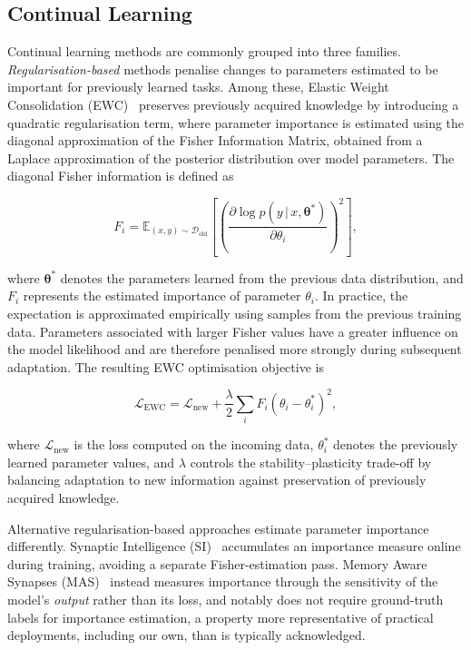 \documentclass[journal]{IEEEtran}
\begin{document}
\subsection{Continual Learning}
\label{sec:related_cl}

Continual learning methods are commonly grouped into three families.
\emph{Regularisation-based} methods penalise changes to parameters
estimated to be important for previously learned tasks. Among these,
Elastic Weight Consolidation (EWC)~\cite{kirkpatrick2017overcoming}
preserves previously acquired knowledge by introducing a quadratic
regularisation term, where parameter importance is estimated using the
diagonal approximation of the Fisher Information Matrix, obtained from a
Laplace approximation of the posterior distribution over model
parameters. The diagonal Fisher information is defined as

\begin{equation}
F_i =
\mathbb{E}_{(x,y)\sim\mathcal{D}_{\mathrm{old}}}
\left[
\left(
\frac{\partial
\log p(y\,|\,x,\boldsymbol{\theta}^{*})}
{\partial \theta_i}
\right)^2
\right],
\label{eq:fisher}
\end{equation}

where $\boldsymbol{\theta}^{*}$ denotes the parameters learned from the
previous data distribution, and $F_i$ represents the estimated
importance of parameter $\theta_i$. In practice, the expectation is
approximated empirically using samples from the previous training data.
Parameters associated with larger Fisher values have a greater influence
on the model likelihood and are therefore penalised more strongly during
subsequent adaptation. The resulting EWC optimisation objective is

\begin{equation}
\mathcal{L}_{\mathrm{EWC}}
=
\mathcal{L}_{\mathrm{new}}
+
\frac{\lambda}{2}
\sum_i
F_i
\left(
\theta_i-\theta_i^{*}
\right)^2,
\label{eq:ewc}
\end{equation}

where $\mathcal{L}_{\mathrm{new}}$ is the loss computed on the incoming
data, $\theta_i^{*}$ denotes the previously learned parameter values,
and $\lambda$ controls the stability--plasticity trade-off by balancing
adaptation to new information against preservation of previously
acquired knowledge.

Alternative regularisation-based approaches estimate parameter
importance differently. Synaptic Intelligence (SI)~\cite{zenke2017continual}
accumulates an importance measure online during training, avoiding a
separate Fisher-estimation pass. Memory Aware Synapses
(MAS)~\cite{aljundi2018memory} instead measures importance through the
sensitivity of the model's \emph{output} rather than its loss, and
notably does not require ground-truth labels for importance estimation, a property more representative of practical
deployments, including our own, than is typically acknowledged.
\end{document}
